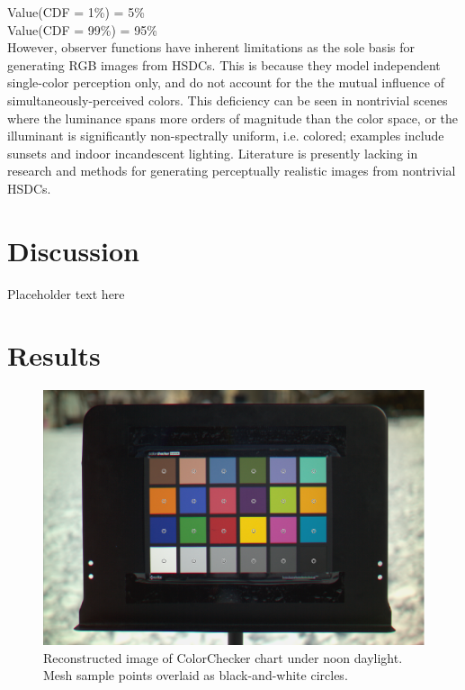 \documentclass[twocolumn,10pt]{asme2ej}
\begin{document}
Value(CDF = 1\%) = 5\%\\
Value(CDF = 99\%) = 95\%\\

However, observer functions have inherent limitations as the sole basis for generating RGB images from HSDCs. This is because they model independent single-color perception only, and do not account for the the mutual influence of simultaneously-perceived colors. This deficiency can be seen in nontrivial scenes where the luminance spans more orders of magnitude than the color space, or the illuminant is significantly non-spectrally uniform, i.e. colored; examples include sunsets and indoor incandescent lighting. Literature is presently lacking in research and methods for generating perceptually realistic images from nontrivial HSDCs.

\section{Discussion}

Placeholder text here

\clearpage

\onecolumn

\section{Results}

\begin{figure}[H]
\begin{centering}
  \includegraphics[height=0.55\linewidth]{colorchecker.png}
  \caption{Reconstructed image of ColorChecker chart under noon daylight. Mesh sample points overlaid as black-and-white circles.}
  \label{colorchecker_mesh}
  \end{centering}
\end{figure}
\end{document}
